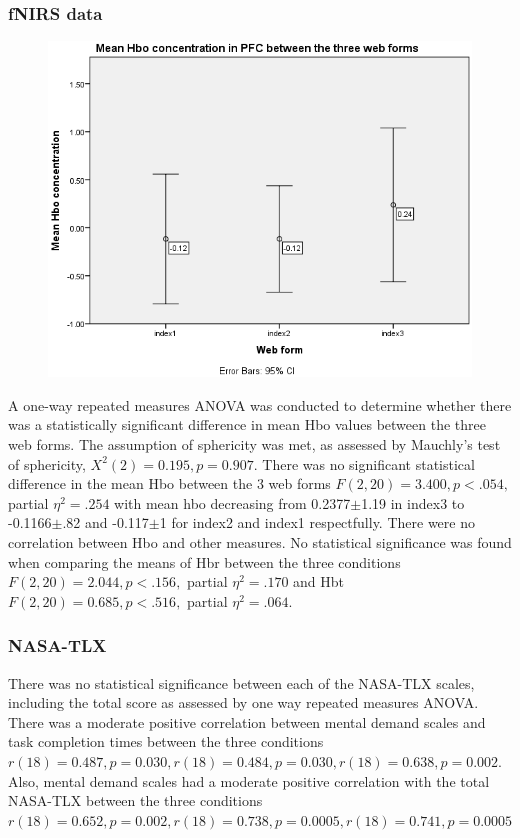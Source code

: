 \documentclass[a4paper]{report}
\begin{document}
			\subsubsection{fNIRS data}	
			\begin{figure}[h]
				\centering
				\includegraphics[width=0.7\linewidth]{mean-hbo-index123}
				\caption[Mean oxygenated hemoglobin between the three web forms]{}
				\label{fig:mean-hbo-index123}
			\end{figure}
			A one-way repeated measures ANOVA was conducted to determine whether there was a statistically significant difference in mean Hbo values between the three web forms. The assumption of sphericity was met, as assessed by Mauchly's test of sphericity, $X^{2}(2) = 0.195, p = 0.907$. There was no significant statistical difference in the mean Hbo between the 3 web forms  $F(2,20)=3.400, p<.054,$ partial $\eta^{2}=.254$ with mean hbo decreasing from 0.2377$\pm$1.19 in index3 to -0.1166$\pm$.82 and -0.117$\pm$1 for index2 and index1 respectfully. There were no correlation between Hbo and other measures.	
			No statistical significance was found when comparing the means of Hbr between the three conditions $F(2,20)=2.044, p<.156,$ partial $\eta^{2}=.170$ and Hbt $F(2,20)=0.685, p<.516,$ partial $\eta^{2}=.064$.
			\subsubsection{NASA-TLX}
			There was no statistical significance between each of the NASA-TLX scales, including the total score as assessed by one way repeated measures ANOVA.
			There was a moderate positive correlation between mental demand scales and task completion times between the three conditions  $r(18)=0.487, p=0.030,  r(18)=0.484, p=0.030,  r(18)=0.638, p=0.002$. Also, mental demand scales had a moderate positive correlation with the total NASA-TLX between the three conditions $r(18)=0.652, p=0.002,  r(18)=0.738, p=0.0005,  r(18)=0.741, p=0.0005$
\end{document}
